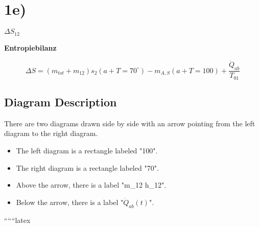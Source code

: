 

\section*{1e)}

\(\Delta S_{12}\)

\textbf{Entropiebilanz}

\[
\Delta S = (m_{tot} + m_{12}) s_2 (a + T = 70^\circ) - m_{A, S} (a + T = 100) + \frac{\dot{Q}_{ab}}{T_{01}}
\]

\subsection*{Diagram Description}

There are two diagrams drawn side by side with an arrow pointing from the left diagram to the right diagram.

\begin{itemize}
    \item The left diagram is a rectangle labeled "100".
    \item The right diagram is a rectangle labeled "70".
    \item Above the arrow, there is a label "m_{12} h_{12}".
    \item Below the arrow, there is a label "\(\dot{Q}_{ab}(t)\)".
\end{itemize}

``````latex